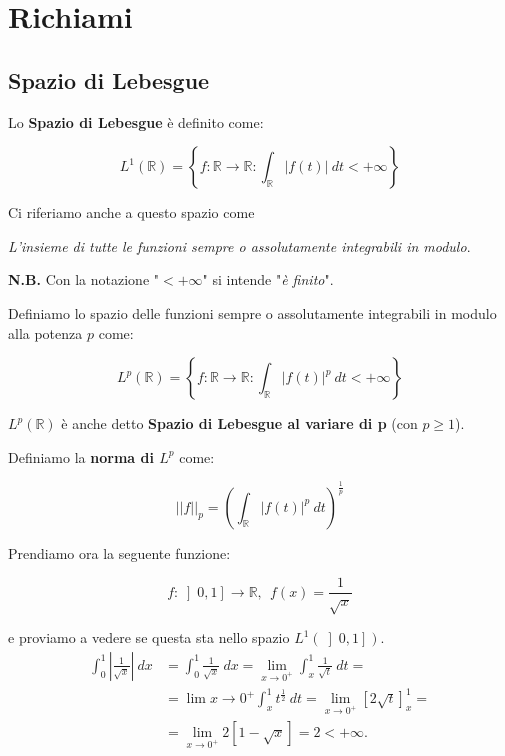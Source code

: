 \chapter{Richiami}

\section{Spazio di Lebesgue}

\begin{definition}
    Lo \textbf{Spazio di Lebesgue} è definito come:

    $$
        L^1(\mathbb{R}) = \left \{ f: \mathbb{R} \rightarrow \mathbb{R} : \int_\mathbb{R} |f(t)| \ dt < +\infty \right \}
    $$
\end{definition}

Ci riferiamo anche a questo spazio come
\begin{center}
    \textit{L'insieme di tutte le funzioni sempre o assolutamente integrabili in modulo}.
\end{center}

\textbf{N.B.} Con la notazione "$< +\infty$" si intende "\textit{è finito}".

\begin{definition}
    Definiamo lo spazio delle funzioni sempre o assolutamente integrabili in
    modulo alla potenza $p$ come:

    $$
        L^p(\mathbb{R}) = \left \{ f: \mathbb{R} \rightarrow \mathbb{R} : \int_\mathbb{R} |f(t)|^p \ dt < +\infty \right \}
    $$

    $L^p (\mathbb{R})$ è anche detto \textbf{Spazio di Lebesgue al variare di p} (con $p \ge 1$).
\end{definition}

\begin{definition}
    Definiamo la \textbf{norma di $L^p$} come:

    $$
        ||f||_p = \left( \int_{\mathbb{R}} |f(t)|^p \ dt \right)^{\frac{1}{p}}
    $$
\end{definition}

Prendiamo ora la seguente funzione:

$$
    f : \left] 0, 1 \right] \rightarrow \mathbb{R}, \ \ f(x) = \frac{1}{\sqrt{x}}
$$

e proviamo a vedere se questa sta nello spazio $L^1(\left] 0, 1 \right])$.
\begin{equation}
    \begin{aligned}
        \int_{0}^{1} |\frac{1}{\sqrt{x}}| \ dx & = \int_{0}^{1} \frac{1}{\sqrt{x}} \ dx = \lim_{x \rightarrow 0^+} \int_{x}^{1} \frac{1}{\sqrt{t}} \ dt =        \\
                                               & = \lim{x \rightarrow 0^+} \int_{x}^{1} t^{\frac{1}{2}} \ dt = \lim_{x \rightarrow 0^+} [ 2 \sqrt{t} ]_{x}^{1} = \\
                                               & = \lim_{x \rightarrow 0^+} 2 [1 - \sqrt{x}] = 2 < +\infty.
    \end{aligned}
\end{equation}

